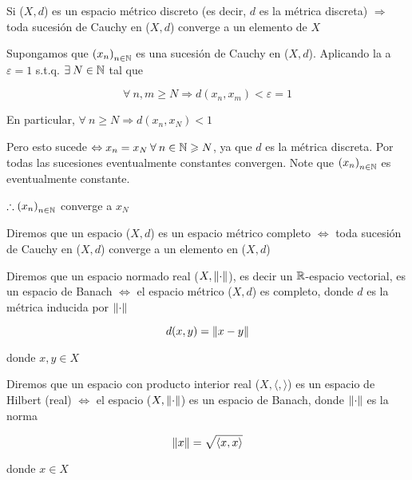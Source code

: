 \begin{eg}
    Si ($X,d$) es un espacio métrico discreto (es decir, $d$ es la métrica discreta) $\Rightarrow$ toda sucesión de Cauchy en ($X,d$) converge a un elemento de $X$
\end{eg}

\begin{proofexplanation}
    Supongamos que ${\left( x_n\right)}_{n \in \mathbb{N}}$ es una sucesión de Cauchy en ($X,d$). Aplicando la  a $\varepsilon =1$ s.t.q. $\exists \: N \in \mathbb{N}$ tal que

    $$\forall \: n, m  \geqslant N \Rightarrow d(x_n,x_m) < \varepsilon = 1$$

    En particular, $\forall \: n \geqslant N \Rightarrow d(x_n,x_N) < 1 $

    Pero esto sucede $\Leftrightarrow x_n = x_N \: \forall \: n \in \mathbb{N} \geqslant N$, ya que $d$ es la métrica discreta. Por  todas las sucesiones eventualmente constantes convergen. Note que ${\left( x_n\right)}_{n \in \mathbb{N}}$ es eventualmente constante.

    $\therefore {\left( x_n\right)}_{n \in \mathbb{N}}$ converge a $x_N$
\end{proofexplanation}

\begin{definition} \label{def418}
    Diremos que un espacio ($X,d$) es un espacio métrico completo $\iff$ toda sucesión de Cauchy en ($X,d$) converge a un elemento en ($X,d$) 
\end{definition}

\begin{definition}
    Diremos que un espacio normado real ($X, \norm{\cdot}$), es decir un $\mathbb{R}$-espacio vectorial, es un espacio de Banach $\iff$ el espacio métrico ($X,d$) es completo, donde $d$ es la métrica inducida por $\norm{\cdot}$

    $$d(x,y) = \norm{x -y}$$

    donde $x, y \in X$
\end{definition}

\begin{definition}
    Diremos que un espacio con producto interior real ($X, \langle ,  \rangle$) es un espacio de Hilbert (real) $\iff$ el espacio ($X, \norm{\cdot}$) es un espacio de Banach, donde $\norm{\cdot}$ es la norma

    $$\norm{x} = \sqrt{\langle x, x \rangle}$$

    donde $x \in X$
\end{definition}

